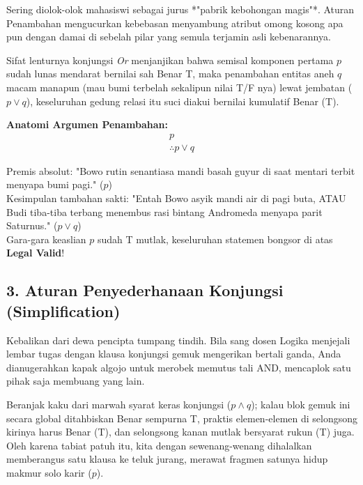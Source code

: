 Sering diolok-olok mahasiswi sebagai jurus *"pabrik kebohongan magis"*. Aturan Penambahan mengucurkan kebebasan menyambung atribut omong kosong apa pun dengan damai di sebelah pilar yang semula terjamin asli kebenarannya.

\begin{teorema}
Sifat lenturnya konjungsi \textit{Or} menjanjikan bahwa semisal komponen pertama $p$ sudah lunas mendarat bernilai sah Benar T, maka penambahan entitas aneh $q$ macam manapun (mau bumi terbelah sekalipun nilai T/F nya) lewat jembatan ($p \lor q$), keseluruhan gedung relasi itu suci diakui bernilai kumulatif Benar (T).
\end{teorema}

\textbf{Anatomi Argumen Penambahan:}
\[
\begin{array}{c}
p \\
\hline
\therefore p \vee q
\end{array}
\]

\begin{contoh}
Premis absolut: "Bowo rutin senantiasa mandi basah guyur di saat mentari terbit menyapa bumi pagi." ($p$) \\
Kesimpulan tambahan sakti: "Entah Bowo asyik mandi air di pagi buta, ATAU Budi tiba-tiba terbang menembus rasi bintang Andromeda menyapa parit Saturnus." ($p \lor q$) \\
Gara-gara keaslian $p$ sudah T mutlak, keseluruhan statemen bongsor di atas \textbf{Legal Valid}!
\end{contoh}

\subsection{3. Aturan Penyederhanaan Konjungsi (Simplification)}

Kebalikan dari dewa pencipta tumpang tindih. Bila sang dosen Logika menjejali lembar tugas dengan klausa konjungsi gemuk mengerikan bertali ganda, Anda dianugerahkan kapak algojo untuk merobek memutus tali AND, mencaplok satu pihak saja membuang yang lain.

\begin{teorema}[Penyederhanaan]
Beranjak kaku dari marwah syarat keras konjungsi ($p \land q$); kalau blok gemuk ini secara global ditahbiskan Benar sempurna T, praktis elemen-elemen di selongsong kirinya harus Benar (T), dan selongsong kanan mutlak bersyarat rukun (T) juga. Oleh karena tabiat patuh itu, kita dengan sewenang-wenang dihalalkan memberangus satu klausa ke teluk jurang, merawat fragmen satunya hidup makmur solo karir ($p$).
\end{teorema}

